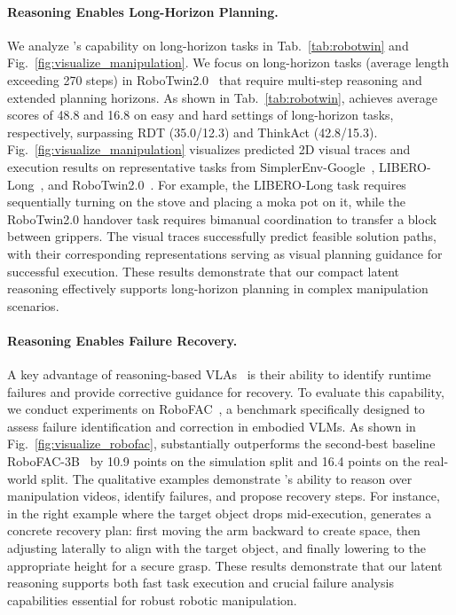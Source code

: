 \paragraph{Reasoning Enables Long-Horizon Planning.}



We analyze \ours{}'s capability on long-horizon tasks in Tab.~\ref{tab:robotwin} and Fig.~\ref{fig:visualize_manipulation}. We focus on long-horizon tasks (average length exceeding 270 steps) in RoboTwin2.0~\cite{chen2025robotwin2} that require multi-step reasoning and extended planning horizons. As shown in Tab.~\ref{tab:robotwin}, \ours{} achieves average scores of 48.8 and 16.8 on easy and hard settings of long-horizon tasks, respectively, surpassing RDT (35.0/12.3) and ThinkAct (42.8/15.3). Fig.~\ref{fig:visualize_manipulation} visualizes predicted 2D visual traces and execution results on representative tasks from SimplerEnv-Google~\cite{li24simpler}, LIBERO-Long~\cite{liu2023libero}, and RoboTwin2.0~\cite{chen2025robotwin2}. For example, the LIBERO-Long task requires sequentially turning on the stove and placing a moka pot on it, while the RoboTwin2.0 handover task requires bimanual coordination to transfer a block between grippers. The visual traces successfully predict feasible solution paths, with their corresponding representations serving as visual planning guidance for successful execution. These results demonstrate that our compact latent reasoning effectively supports long-horizon planning in complex manipulation scenarios.

\paragraph{Reasoning Enables Failure Recovery.}



A key advantage of reasoning-based VLAs~\cite{huang2025thinkact,abdolmaleki2025gemini} is their ability to identify runtime failures and provide corrective guidance for recovery. To evaluate this capability, we conduct experiments on RoboFAC~\cite{lu2025robofac}, a benchmark specifically designed to assess failure identification and correction in embodied VLMs. As shown in Fig.~\ref{fig:visualize_robofac}, \ours{} substantially outperforms the second-best baseline RoboFAC-3B~\cite{lu2025robofac} by 10.9 points on the simulation split and 16.4 points on the real-world split. The qualitative examples demonstrate \ours{}'s ability to reason over manipulation videos, identify failures, and propose recovery steps. For instance, in the right example where the target object drops mid-execution, \ours{} generates a concrete recovery plan: first moving the arm backward to create space, then adjusting laterally to align with the target object, and finally lowering to the appropriate height for a secure grasp. These results demonstrate that our latent reasoning supports both fast task execution and crucial failure analysis capabilities essential for robust robotic manipulation.


